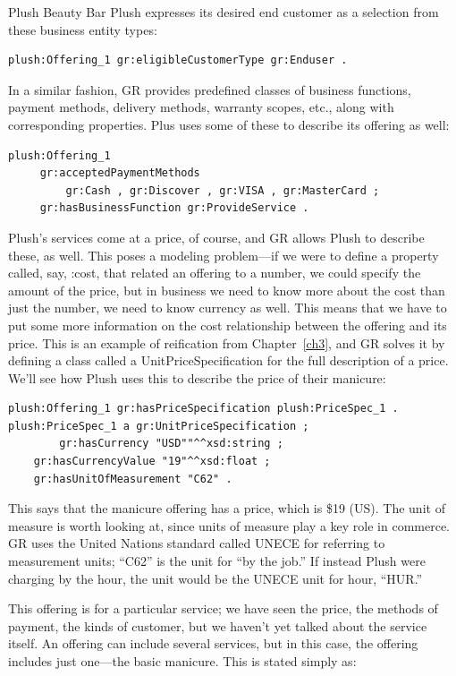 \begin{example}{Plush Beauty Bar}
Plush expresses its desired end customer as a selection from these
business entity types:

\begin{lstlisting}
plush:Offering_1 gr:eligibleCustomerType gr:Enduser .
\end{lstlisting}

In a similar fashion, GR provides predefined classes of business
functions, payment methods, delivery methods, warranty scopes, etc.,
along with corresponding properties. Plus uses some of these to describe
its offering as well:

\begin{lstlisting}
plush:Offering_1
     gr:acceptedPaymentMethods
         gr:Cash , gr:Discover , gr:VISA , gr:MasterCard ;
     gr:hasBusinessFunction gr:ProvideService .
\end{lstlisting}

Plush's services come at a price, of course, and GR allows Plush to
describe these, as well. This poses a modeling problem---if we were to
define a property called, say, :cost, that related an offering to a
number, we could specify the amount of the price, but in business we
need to know more about the cost than just the number, we need to know
currency as well. This means that we have to put some more information
on the cost relationship between the offering and its price. This is an
example of reification from Chapter~\ref{ch3}, and GR solves it by defining a
class called a UnitPriceSpecification for the full description of a
price. We'll see how Plush uses this to describe the price of their
manicure:

\begin{lstlisting}
plush:Offering_1 gr:hasPriceSpecification plush:PriceSpec_1 .
plush:PriceSpec_1 a gr:UnitPriceSpecification ;
        gr:hasCurrency "USD""^^xsd:string ; 
	gr:hasCurrencyValue "19"^^xsd:float ; 
	gr:hasUnitOfMeasurement "C62" .
\end{lstlisting}

This says that the manicure offering has a price, which is \$19 (US).
The unit of measure is worth looking at, since units of measure play a
key role in commerce. GR uses the United Nations standard called UNECE
for referring to measurement units; ``C62'' is the unit for ``by the
job.'' If instead Plush were charging by the hour, the unit would be the
UNECE unit for hour, ``HUR.''

This offering is for a particular service; we have seen the price, the
methods of payment, the kinds of
customer, but we haven't yet talked about the service itself. An
offering can include several services, but in this case, the offering
includes just one---the basic manicure. This is stated simply as:


\end{example}
